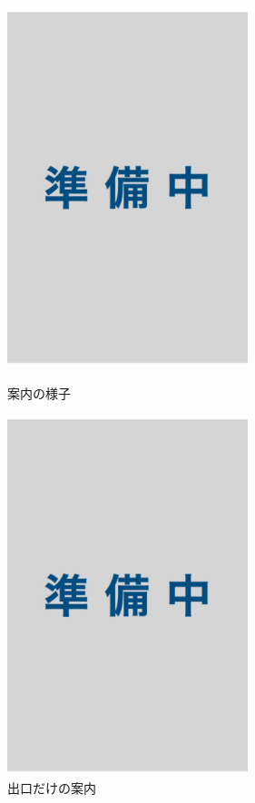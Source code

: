 \begin{figure}[htbp]
  \begin{minipage}{0.5\hsize}
    \centering
    \includegraphics[width=70mm]{images/wip2.jpg}
    \caption{案内の様子} \label{fig:ar_navigation_jibotyo_ski}
  \end{minipage}
  \begin{minipage}{0.5\hsize}
    \centering
    \includegraphics[width=70mm]{images/wip2.jpg}
    \caption{出口だけの案内} \label{fig:ar_navigation_jibotyo_lunch}
  \end{minipage}
\end{figure}


